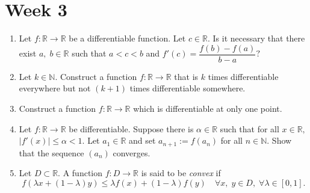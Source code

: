 \documentclass{article}
\begin{document}
\section{Week 3}
\begin{enumerate} 
	\item Let $f:\mathbb{R}\to\mathbb{R}$ be a differentiable function. Let $c \in \mathbb{R}.$ Is it necessary that there exist $a,\;b \in \mathbb{R}$ such that $a < c < b$ and $f'(c) = \dfrac{f(b) - f(a)}{b - a}?$
	\item Let $k\in \mathbb{N}.$ Construct a function $f:\mathbb{R}\to\mathbb{R}$ that is $k$ times differentiable everywhere but not $(k+1)$ times differentiable somewhere.
	\item Construct a function $f:\mathbb{R}\to\mathbb{R}$ which is differentiable at only one point.
	\item Let $f:\mathbb{R}\to\mathbb{R}$ be differentiable. Suppose there is $\alpha \in \mathbb{R}$ such that for all $x \in \mathbb{R},$ $|f'(x)| \le \alpha < 1.$ Let $a_1 \in \mathbb{R}$ and set $a_{n+1} := f(a_n)$ for all $n \in \mathbb{N}.$ Show that the sequence $(a_n)$ converges.
	\item Let $D \subset \mathbb{R}.$ A function $f:D\to \mathbb{R}$ is said to be \emph{convex} if
	\[f(\lambda x + (1 - \lambda)y) \le \lambda f(x) + (1 - \lambda)f(y) \quad \forall x,\;y\in D,\;\forall \lambda\in [0, 1].\]
	

\end{enumerate}
\end{document}

